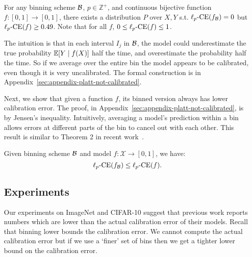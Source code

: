\newcommand{\continuousNotCalibratedText}{
  For any binning scheme $\bins{}$, $p \in \mathbb{Z}^+$, and continuous bijective function $f : [0, 1] \to [0, 1]$, there exists a distribution \pl{mathbb} $P$ over $X, Y$ s.t. $\lpce(f_{\bins{}}) = 0$ but $\lpce(f) \geq 0.49$.
Note that for all $f$, $0 \leq \lpce(f) \leq 1$.
}

\begin{example}
\label{ex:continuous-not-calibrated}
\continuousNotCalibratedText{}
\end{example}

\newtheorem*{continuousNotCalibrated}{Restatement of Example~\ref{ex:continuous-not-calibrated}}

The intuition  is that in each interval $I_j$ in $\mathcal{B}{}$, the model could underestimate the true probability $\mathbb{E}[Y \mid f(X)]$ half the time, and overestimate the probability half the time. So if we average over the entire bin the model appears to be calibrated, even though it is very uncalibrated. The formal construction is in Appendix~\ref{sec:appendix-platt-not-calibrated}.

Next, we show that given a function $f$, its binned version always has lower calibration error. The proof, in Appendix~\ref{sec:appendix-platt-not-calibrated}, is by Jensen's inequality. Intuitively, averaging a model's prediction within a bin allows errors at different parts of the bin to cancel out with each other. This result is similar to Theorem 2 in recent work~\cite{vaicenavicius2019calibration}.

\newcommand{\binningLowerBoundText}{
  Given \pl{any} binning scheme $\bins{}$ and model $f : \mathcal{X} \to [0, 1]$, we have:
\[  \lpce(f_{\bins{}}) \leq \lpce(f). \]
\pl{number the equations}
}

\begin{proposition}
\label{prop:bin_low_bound}
\binningLowerBoundText{}
\end{proposition}

\newtheorem*{binningLowerBound}{Restatement of Proposition~\ref{prop:bin_low_bound}}

\subsection{Experiments}

Our experiments on ImageNet and CIFAR-10 suggest that previous work reports numbers which are lower than the actual calibration error of their models. Recall that binning lower bounds the calibration error. We cannot compute the actual calibration error but if we use a `finer' set of bins then we get a tighter lower bound on the calibration error.

